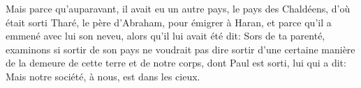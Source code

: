 Mais parce qu’auparavant, il avait eu un autre pays, le pays des Chaldéens,
	d’où était sorti Tharé, le père d’Abraham, pour émigrer à Haran,
		et parce qu’il a emmené avec lui son neveu,
		alors qu’il lui avait été dit: Sors de ta parenté,
	examinons si sortir de son pays ne voudrait pas dire
	sortir d’une certaine manière de la demeure de cette terre
		et de notre corps,
	dont Paul est sorti, lui qui a dit:
	Mais notre société, à nous, est dans les cieux.
